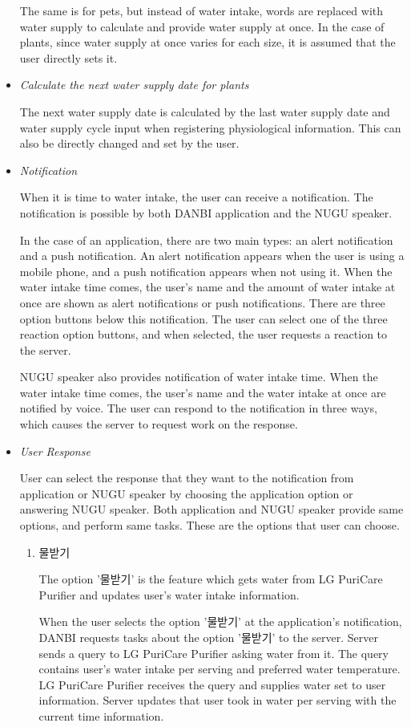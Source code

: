 \documentclass[conference]{IEEEtran}
\begin{document}
\begin{itemize}
The same is for pets, but instead of water intake, words are replaced with water supply to calculate and provide water supply at once.  In the case of plants, since water supply at once varies for each size, it is assumed that the user directly sets it.
\item \textit{Calculate the next water supply date for plants}

The next water supply date is calculated by the last water supply date and water supply cycle input when registering physiological information. This can also be directly changed and set by the user.
\item \textit{Notification}

When it is time to water intake, the user can receive a notification. The notification is possible by both DANBI application and the NUGU speaker.

In the case of an application, there are two main types: an alert notification and a push notification. An alert notification appears when the user is using a mobile phone, and a push notification appears when not using it. When the water intake time comes, the user's name and the amount of water intake at once are shown as alert notifications or push notifications. There are three option buttons below this notification. The user can select one of the three reaction option buttons, and when selected, the user requests a reaction to the server.

NUGU speaker also provides notification of water intake time. When the water intake time comes, the user's name and the water intake at once are notified by voice. The user can respond to the notification in three ways, which causes the server to request work on the response.
\item \textit{User Response}

User can select the response that they want to the notification from application or NUGU speaker by choosing the application option or answering NUGU speaker. Both application and NUGU speaker provide same options, and perform same tasks. These are the options that user can choose.
\begin{enumerate}
\setlength{\parindent}{2ex}
\setlength{\parskip}{0.5em}
\item 물받기

The option '물받기' is the feature which gets water from LG PuriCare Purifier and updates user's water intake information.

When the user selects the option '물받기' at the application's notification, DANBI requests tasks about the option '물받기' to the server. Server sends a query to LG PuriCare Purifier asking water from it. The query contains user's water intake per serving and preferred water temperature. LG PuriCare Purifier receives the query and supplies water set to user information. Server updates that user took in water per serving with the current time information.


\end{enumerate}
\end{itemize}
\end{document}

